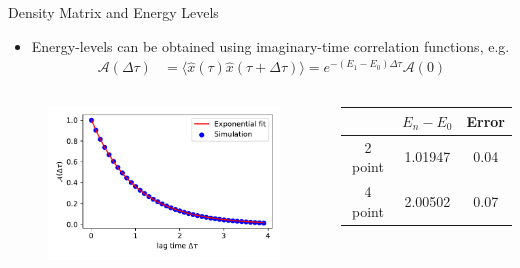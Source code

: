 \documentclass[final,hyperref={pdfpagelabels=false}]{beamer}
\begin{document}
\begin{frame}[t]
\begin{columns}[t]
\begin{column}{.48\textwidth}
\begin{block}{Density Matrix and Energy Levels}
\begin{itemize}
\item Energy-levels can be obtained using imaginary-time correlation functions, e.g.
\begin{align*}
\mathcal{A}(\Delta \tau) & =\langle \hat{x}(\tau) \hat{x}(\tau+\Delta \tau)\rangle = e^{-\left(E_1-E_0\right) \Delta \tau} \mathcal{A}(0)
\end{align*}
\end{itemize}

\begin{columns}[T,onlytextwidth]
\begin{figure}[H]
\centering
\includegraphics[width=\textwidth]{figures/two_point_correlation.pdf}
\end{figure}

	\vspace{3.5cm}
\begin{table}[ht]
    \centering
    \begin{tabular}{ccc} %
        \toprule %
        & $E_n - E_0$ & Error \\
        \midrule %
        2 point & 1.01947 & 0.04 \\
        4 point & 2.00502 & 0.07 \\
        \bottomrule %
    \end{tabular}
\end{table}

\end{columns}

\end{block}


\end{column}
\end{columns}
\end{frame}
\end{document}
